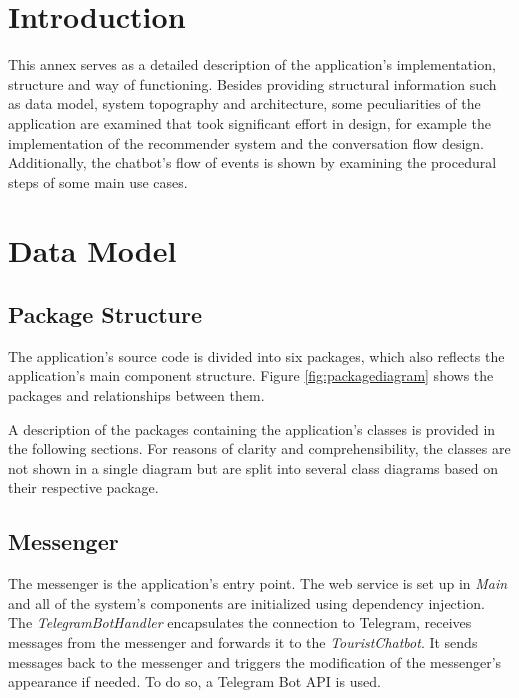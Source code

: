 
\section{Introduction}
This annex serves as a detailed description of the application’s implementation, structure and way of functioning. Besides providing structural information such as data model, system topography and architecture, some peculiarities of the application are examined that took significant effort in design, for example the implementation of the recommender system and the conversation flow design. Additionally, the chatbot’s flow of events is shown by examining the procedural steps of some main use cases.

\section{Data Model}
\subsection{Package Structure}
The application’s source code is divided into six packages, which also reflects the application’s main component structure. Figure \ref{fig:packagediagram} shows the packages and relationships between them. 


A description of the packages containing the application’s classes is provided in the following sections. For reasons of clarity and comprehensibility, the classes are not shown in a single diagram but are split into several class diagrams based on their respective package.

\subsection{Messenger}
The messenger is the application’s entry point. The web service is set up in \textit{Main} and all of the system’s components are initialized using dependency injection. The \textit{TelegramBotHandler} encapsulates the connection to Telegram, receives messages from the messenger and forwards it to the  \textit{TouristChatbot}. It sends messages back to the messenger and triggers the modification of the messenger’s appearance if needed. To do so, a Telegram Bot API \cite{telegrambotapi} is used.


